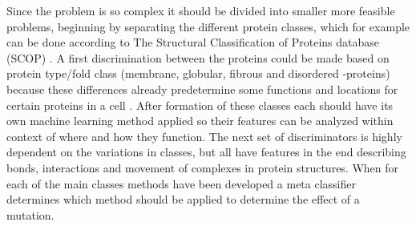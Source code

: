 Since the problem is so complex it should be divided into smaller more feasible problems, beginning by separating the different protein classes, which  for example can be done according to The Structural Classification of Proteins database (SCOP) \cite{andreeva_scop2_2014}. A first discrimination between the proteins could be made based on protein type/fold class (membrane, globular, fibrous and disordered -proteins) because these differences already predetermine some functions and locations for certain proteins in a cell \cite{wikipedia_membrane_2019, wikipedia_globular_2019,wikipedia_scleroprotein_2018,wikipedia_intrinsically_2019}. After formation of these classes each should have its own machine learning method applied so their features can be analyzed within context of where and how they function. The next set of discriminators is highly dependent on the variations in classes, but all have features in the end describing bonds, interactions and movement of complexes in protein structures. When for each of the main classes methods have been developed a meta classifier determines which method should be applied to determine the effect of a mutation.
\label{subsec:GD_theoratical_large_scale_implementation}